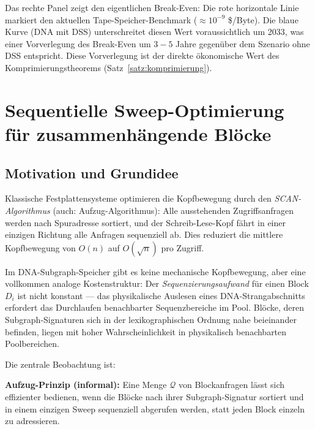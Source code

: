 ﻿\documentclass[a4paper,12pt]{article}
\theoremstyle{definition}
\theoremstyle{plain}
\begin{document}
Das rechte Panel zeigt den eigentlichen Break-Even: Die rote horizontale
Linie markiert den aktuellen Tape-Speicher-Benchmark ($\approx 10^{-9}$ \$/Byte).
Die blaue Kurve (DNA mit DSS) unterschreitet diesen Wert voraussichtlich
um 2033, was einer Vorverlegung des Break-Even um $3{-}5$ Jahre gegenüber
dem Szenario ohne DSS entspricht.  Diese Vorverlegung ist der direkte
ökonomische Wert des Komprimierungstheorems (Satz~\ref{satz:komprimierung}).

\section{Sequentielle Sweep-Optimierung für zusammenhängende Blöcke}
\label{sec:elevator}

\subsection{Motivation und Grundidee}
\label{ssec:elevator_motivation}

Klassische Festplattensysteme optimieren die Kopfbewegung durch den
\emph{SCAN-Algorithmus} (auch: Aufzug-Algorithmus): Alle ausstehenden
Zugriffsanfragen werden nach Spuradresse sortiert, und der
Schreib-Lese-Kopf fährt in einer einzigen Richtung alle Anfragen
sequenziell ab.  Dies reduziert die mittlere Kopfbewegung von $O(n)$
auf $O(\sqrt{n})$ pro Zugriff.

Im DNA-Subgraph-Speicher gibt es keine mechanische Kopfbewegung,
aber eine vollkommen analoge Kostenstruktur: Der \emph{Sequenzierungsaufwand}
für einen Block $D_i$ ist nicht konstant --- das physikalische Auslesen
eines DNA-Strangabschnitts erfordert das Durchlaufen benachbarter
Sequenzbereiche im Pool.  Blöcke, deren Subgraph-Signaturen sich in der
lexikographischen Ordnung nahe beieinander befinden, liegen mit hoher
Wahrscheinlichkeit in physikalisch benachbarten Poolbereichen.

Die zentrale Beobachtung ist:

\begin{mdframed}
  \textbf{Aufzug-Prinzip (informal):} Eine Menge $\mathcal{Q}$ von
  Blockanfragen lässt sich effizienter bedienen, wenn die Blöcke nach
  ihrer Subgraph-Signatur sortiert und in einem einzigen Sweep sequenziell
  abgerufen werden, statt jeden Block einzeln zu adressieren.
\end{mdframed}
\end{document}
